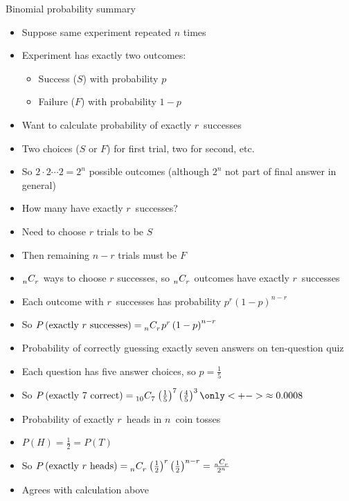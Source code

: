 \documentclass[xcolor=dvipsnames]{beamer}
\theoremstyle{definition}
\newcommand\ncr[2]{\tensor[_{#1}]C{_{#2}}}
\begin{document}
\begin{frame}{Binomial probability summary}
\begin{itemize}
\item Suppose same experiment repeated $n$ times
\item Experiment has exactly two outcomes:
\begin{itemize}
\item Success ($S$) with probability $p$
\item Failure ($F$) with probability $1-p$
\end{itemize}
\item Want to calculate probability of exactly $r$~successes
\item Two choices ($S$ or $F$) for first trial, two for second, etc.
\item So $2\cdot 2\cdots 2=2^n$ possible outcomes (although $2^n$
not part of final answer in general)
\item How many have exactly $r$~successes?
\item Need to choose $r$ trials to be $S$
\item Then remaining $n-r$ trials must be $F$
\item $\ncr{n}{r}$ ways to choose $r$ successes,
so $\ncr{n}{r}$ outcomes have exactly $r$~successes
\item Each outcome with $r$~successes has probability
$p^r\left(1-p\right)^{n-r}$
\item So $P\left(\text{exactly $r$ successes}\right)
=\ncr{n}{r}p^r\left(1-p\right)^{n-r}$
\end{itemize}
\end{frame}

\begin{frame}
\begin{example}
\begin{itemize}
\item Probability of correctly guessing exactly seven answers
on ten-question quiz
\item Each question has five answer choices,
so $p=\frac{1}{5}$
\item So $P\left(\text{exactly $7$ correct}\right)
=\ncr{10}{7}\left(\frac{1}{5}\right)^7\left(\frac{4}{5}\right)^3
\only<+->{\approx 0.0008}$
\end{itemize}
\end{example}
\begin{example}
\begin{itemize}
\item Probability of exactly $r$~heads in $n$~coin tosses
\item $P\left(H\right)=\frac{1}{2}=P\left(T\right)$
\item So $P\left(\text{exactly $r$ heads}\right)
=\ncr{n}{r}\left(\frac{1}{2}\right)^r\left(\frac{1}{2}\right)^{n-r}
=\frac{\ncr{n}{r}}{2^n}$
\item Agrees with calculation above
\end{itemize}
\end{example}
\end{frame}
\end{document}
